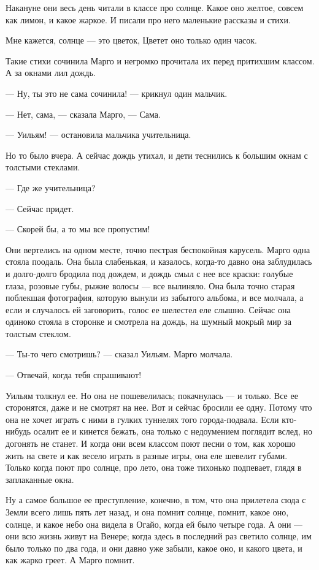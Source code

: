 Накануне они весь день читали в классе про солнце. Какое оно желтое, совсем как
лимон, и какое жаркое. И писали про него маленькие рассказы и стихи.

Мне кажется, солнце — это цветок, Цветет оно только один часок.

Такие стихи сочинила Марго и негромко прочитала их перед притихшим классом. А
за окнами лил дождь.

— Ну, ты это не сама сочинила! — крикнул один мальчик.

— Нет, сама, — сказала Марго, — Сама.

— Уильям! — остановила мальчика учительница.

Но то было вчера. А сейчас дождь утихал, и дети теснились к большим окнам с
толстыми стеклами.

— Где же учительница?

— Сейчас придет.

— Скорей бы, а то мы все пропустим!

Они вертелись на одном месте, точно пестрая беспокойная карусель. Марго одна
стояла поодаль. Она была слабенькая, и казалось, когда-то давно она заблудилась
и долго-долго бродила под дождем, и дождь смыл с нее все краски: голубые глаза,
розовые губы, рыжие волосы — все вылиняло. Она была точно старая поблекшая
фотография, которую вынули из забытого альбома, и все молчала, а если и
случалось ей заговорить, голос ее шелестел еле слышно. Сейчас она одиноко
стояла в сторонке и смотрела на дождь, на шумный мокрый мир за толстым стеклом.

— Ты-то чего смотришь? — сказал Уильям. Марго молчала.

— Отвечай, когда тебя спрашивают!

Уильям толкнул ее. Но она не пошевелилась; покачнулась — и только. Все ее
сторонятся, даже и не смотрят на нее. Вот и сейчас бросили ее одну. Потому что
она не хочет играть с ними в гулких туннелях того города-подвала. Если
кто-нибудь осалит ее и кинется бежать, она только с недоумением поглядит вслед,
но догонять не станет. И когда они всем классом поют песни о том, как хорошо
жить на свете и как весело играть в разные игры, она еле шевелит губами. Только
когда поют про солнце, про лето, она тоже тихонько подпевает, глядя в
заплаканные окна.

Ну а самое большое ее преступление, конечно, в том, что она прилетела сюда с
Земли всего лишь пять лет назад, и она помнит солнце, помнит, какое оно,
солнце, и какое небо она видела в Огайо, когда ей было четыре года. А они — они
всю жизнь живут на Венере; когда здесь в последний раз светило солнце, им было
только по два года, и они давно уже забыли, какое оно, и какого цвета, и как
жарко греет. А Марго помнит.

